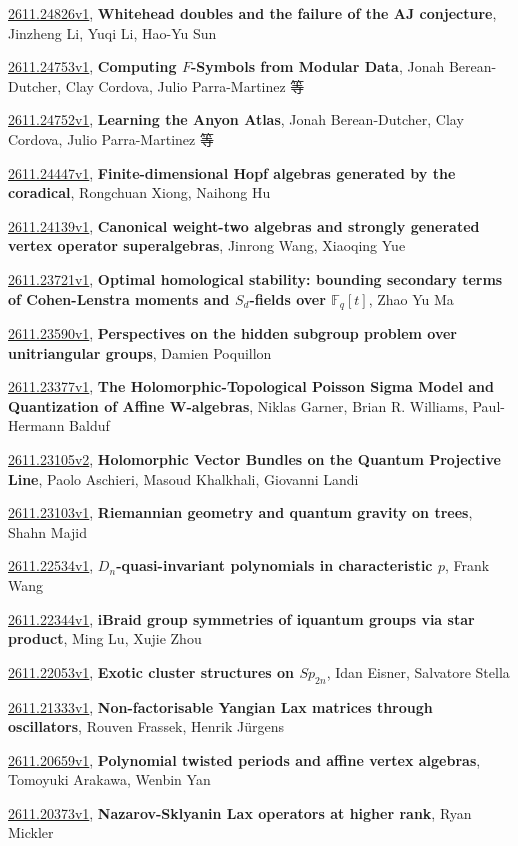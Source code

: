 \documentclass[9pt, a4paper]{article}
\theoremstyle{plain}
\theoremstyle{definition}
\theoremstyle{remark}
\newcommand{\arxiv}[3]{\href{https://arxiv.org/abs/#1}{#1}, \textbf{\textcolor{arxivblue}{#2}}, #3}
\begin{document}
\arxiv{2611.24826v1}{Whitehead doubles and the failure of the AJ conjecture}{Jinzheng Li, Yuqi Li, Hao-Yu Sun}

\arxiv{2611.24753v1}{Computing $F$-Symbols from Modular Data}{Jonah Berean-Dutcher, Clay Cordova, Julio Parra-Martinez 等}

\arxiv{2611.24752v1}{Learning the Anyon Atlas}{Jonah Berean-Dutcher, Clay Cordova, Julio Parra-Martinez 等}

\arxiv{2611.24447v1}{Finite-dimensional Hopf algebras generated by the coradical}{Rongchuan Xiong, Naihong Hu}

\arxiv{2611.24139v1}{Canonical weight-two algebras and strongly generated vertex operator superalgebras}{Jinrong Wang, Xiaoqing Yue}

\arxiv{2611.23721v1}{Optimal homological stability: bounding secondary terms of Cohen-Lenstra moments and $S_d$-fields over $\mathbb{F}_q[t]$}{Zhao Yu Ma}

\arxiv{2611.23590v1}{Perspectives on the hidden subgroup problem over unitriangular groups}{Damien Poquillon}

\arxiv{2611.23377v1}{The Holomorphic-Topological Poisson Sigma Model and Quantization of Affine W-algebras}{Niklas Garner, Brian R. Williams, Paul-Hermann Balduf}

\arxiv{2611.23105v2}{Holomorphic Vector Bundles on the Quantum Projective Line}{Paolo Aschieri, Masoud Khalkhali, Giovanni Landi}

\arxiv{2611.23103v1}{Riemannian geometry and quantum gravity on trees}{Shahn Majid}

\arxiv{2611.22534v1}{$D_n$-quasi-invariant polynomials in characteristic $p$}{Frank Wang}

\arxiv{2611.22344v1}{iBraid group symmetries of iquantum groups via star product}{Ming Lu, Xujie Zhou}

\arxiv{2611.22053v1}{Exotic cluster structures on $Sp_{2n}$}{Idan Eisner, Salvatore Stella}

\arxiv{2611.21333v1}{Non-factorisable Yangian Lax matrices through oscillators}{Rouven Frassek, Henrik Jürgens}

\arxiv{2611.20659v1}{Polynomial twisted periods and affine vertex algebras}{Tomoyuki Arakawa, Wenbin Yan}

\arxiv{2611.20373v1}{Nazarov-Sklyanin Lax operators at higher rank}{Ryan Mickler}

\end{document}
